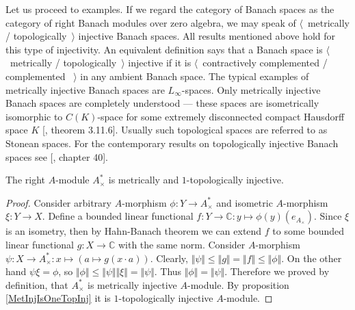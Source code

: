 Let us proceed to examples. If we regard the category of Banach spaces as the category of right Banach modules over zero algebra, we may speak of $\langle$~metrically / topologically~$\rangle$ injective Banach spaces. All results mentioned above hold for this type of injectivity. An equivalent definition says that a Banach space is $\langle$~metrically / topologically~$\rangle$ injective if it is $\langle$~contractively complemented / complemented ~$\rangle$ in any ambient Banach space. The typical examples of metrically injective Banach spaces are $L_\infty$-spaces. Only metrically injective Banach spaces are completely understood --- these spaces are isometrically isomorphic to $C(K)$-space for some extremely disconnected compact Hausdorff space $K$ [\cite{LaceyIsomThOfClassicBanSp}, theorem 3.11.6]. Usually such topological spaces are referred to as Stonean spaces.  For the contemporary results on topologically injective Banach spaces see [\cite{JohnLinHandbookGeomBanSp}, chapter 40].

\begin{proposition}\label{DualOfUnitalAlgIsMetTopInj} The right $A$-module $A_\times^*$ is metrically and $1$-topologically injective.
\end{proposition}
\begin{proof} Consider arbitrary $A$-morphism $\phi:Y\to A_\times^*$ and isometric $A$-morphism $\xi:Y\to X$. Define a bounded linear functional $f:Y\to\mathbb{C}:y\mapsto \phi(y)(e_{A_\times})$. Since $\xi$ is an isometry, then by Hahn-Banach theorem we can extend $f$ to some bounded linear functional $g:X\to\mathbb{C}$ with the same norm. Consider $A$-morphism $\psi:X\to A_\times^*:x\mapsto (a\mapsto g(x\cdot a))$. Clearly, $\Vert\psi\Vert\leq\Vert g\Vert=\Vert f\Vert\leq\Vert\phi\Vert$. On the other hand $\psi\xi=\phi$, so $\Vert\phi\Vert\leq\Vert\psi\Vert\Vert\xi\Vert=\Vert\psi\Vert$. Thus $\Vert\phi\Vert=\Vert\psi\Vert$. Therefore we proved by definition, that $A_\times^*$ is metrically injective $A$-module. By proposition \ref{MetInjIsOneTopInj} it is $1$-topologically injective $A$-module.
\end{proof}

